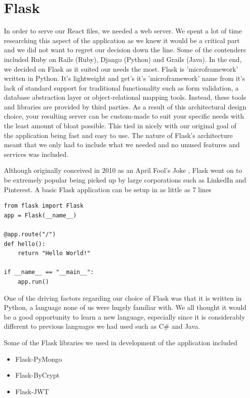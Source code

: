 \section{Flask}
In order to serve our React files, we needed a web server. We spent a lot of time researching this aspect of the application as we knew it would be a critical part and we did not want to regret our decision down the line. Some of the contenders included Ruby on Rails (Ruby), Django (Python) and 
Grails (Java). In the end, we decided on Flask as it suited our needs the most. Flask is 'microframework' written in Python. It's lightweight and get's it's 'microframework' name from it's lack of standard support for traditional functionality such as form validation, a database abstraction layer or object-relational mapping tools. Instead, these tools and libraries are provided by third parties. 
As a result of this architectural design choice, your resulting server can be custom-made to suit your specific needs with the least amount of bloat possible. This tied in nicely with our original goal of the application being fast and easy to use. The nature of Flask's architecture meant that we only had to include what we needed and no unused features and services was included.

Although originally conceived in 2010 as an April Fool's Joke \cite{FlaskOrigins}, Flask went on to be extremely popular being picked up by large corporations such as LinkedIn and Pinterest. A basic Flask application can be setup in as little as 7 lines 

\begin{verbatim}
from flask import Flask
app = Flask(__name__)

@app.route("/")
def hello():
    return "Hello World!"

if __name__ == "__main__":
    app.run()
\end{verbatim}

One of the driving factors regarding our choice of Flask was that it is written in Python, a language none of us were hugely familiar with. We all thought it would be a good opportunity to learn a new language, especially since it is considerably
different to previous languages we had used such as C\# and Java.

Some of the Flask libraries we used in development of the application included 

\begin{itemize}
  \item Flask-PyMongo
  \item Flask-ByCrypt
  \item Flask-JWT
\end{itemize}

